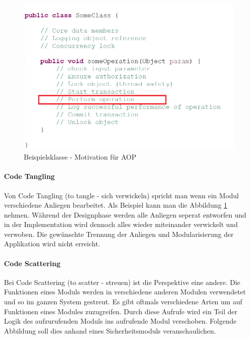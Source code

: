 \begin{figure}[H]
	\centering
		\includegraphics[scale=1.0]{bilder/motivationprogram.png}
	\caption{Beispielsklasse - Motivation für AOP}
	\label{fig:classmotivationaop}
\end{figure}



\paragraph{Code Tangling}

Von Code Tangling (to tangle - sich verwickeln) spricht man wenn ein Modul verschiedene Anliegen bearbeitet. Als Beispiel kann man die Abbildung \ref{fig:classmotivationaop} nehmen. Während der Designphase werden alle Anliegen seperat entworfen und in der Implementation wird dennoch alles wieder miteinander verwickelt und verwoben. Die gewünschte Trennung der Anliegen und Modularisierung der Applikation wird nicht erreicht.

\paragraph{Code Scattering}

Bei Code Scattering (to scatter - streuen) ist die Perspektive eine andere. Die Funktionen eines Moduls werden in verschiedene anderen Modulen verwendetet und so im ganzen System gestreut. Es gibt oftmals verschiedene Arten um auf Funktionen eines Modules zuzugreifen. Durch diese Aufrufe wird ein Teil der Logik des aufzurufenden Moduls ins aufrufende Modul verschoben. Folgende Abbildung soll dies anhand eines Sicherheitsmoduls veranschaulichen.

